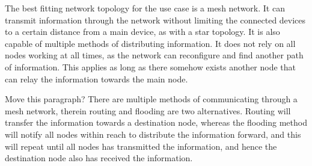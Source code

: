 The best fitting network topology for the use case is a mesh network. It can transmit information through the network without limiting the connected devices to a certain distance from a main device, as with a star topology. It is also capable of multiple methods of distributing information. It does not rely on all nodes working at all times, as the network can reconfigure and find another path of information. This applies as long as there somehow exists another node that can relay the information towards the main node.

Move this paragraph?
There are multiple methods of communicating through a mesh network, therein routing and flooding are two alternatives. Routing will transfer the information towards a destination node, whereas the flooding method will notify all nodes within reach to distribute the information forward, and this will repeat until all nodes has transmitted the information, and hence the destination node also has received the information.


